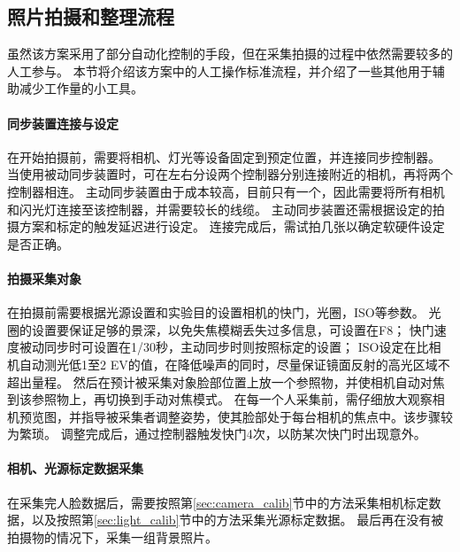 \subsection{照片拍摄和整理流程}
\label{sec:photo_process}

虽然该方案采用了部分自动化控制的手段，但在采集拍摄的过程中依然需要较多的人工参与。
本节将介绍该方案中的人工操作标准流程，并介绍了一些其他用于辅助减少工作量的小工具。

\paragraph{同步装置连接与设定}
在开始拍摄前，需要将相机、灯光等设备固定到预定位置，并连接同步控制器。
当使用被动同步装置时，可在左右分设两个控制器分别连接附近的相机，再将两个控制器相连。
主动同步装置由于成本较高，目前只有一个，因此需要将所有相机和闪光灯连接至该控制器，并需要较长的线缆。
主动同步装置还需根据设定的拍摄方案和标定的触发延迟进行设定。
连接完成后，需试拍几张以确定软硬件设定是否正确。

\paragraph{拍摄采集对象}
在拍摄前需要根据光源设置和实验目的设置相机的快门，光圈，ISO等参数。
光圈的设置要保证足够的景深，以免失焦模糊丢失过多信息，可设置在F8；
快门速度被动同步时可设置在1/30秒，主动同步时则按照标定的设置；
ISO设定在比相机自动测光低1至2 EV的值，在降低噪声的同时，尽量保证镜面反射的高光区域不超出量程。
然后在预计被采集对象脸部位置上放一个参照物，并使相机自动对焦到该参照物上，再切换到手动对焦模式。
在每一个人采集前，需仔细放大观察相机预览图，并指导被采集者调整姿势，使其脸部处于每台相机的焦点中。该步骤较为繁琐。
调整完成后，通过控制器触发快门4次，以防某次快门时出现意外。

\paragraph{相机、光源标定数据采集}
在采集完人脸数据后，需要按照第\ref{sec:camera_calib}节中的方法采集相机标定数据，以及按照第\ref{sec:light_calib}节中的方法采集光源标定数据。
最后再在没有被拍摄物的情况下，采集一组背景照片。

